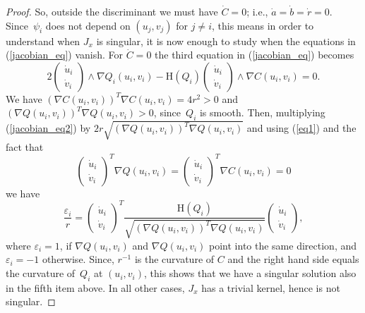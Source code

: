 \documentclass[12pt]{amsart}
\theoremstyle{definition}
\theoremstyle{definition}
\numberwithin{equation}{section}
\begin{document}
\begin{proof}
So, outside the discriminant we must have $\dot C=0$; i.e., $\dot a=\dot b=\dot r=0$. Since~$\psi_i$ does not depend on $(u_j,v_j)$ for $j\neq i$, this means in order to understand when $J_x$ is singular, it is now enough to study when the equations in (\ref{jacobian_eq}) vanish. 
For $\dot C=0$ the third equation in (\ref{jacobian_eq}) becomes
\begin{equation}\label{jacobian_eq2}
2\begin{pmatrix}\dot u_i\\ \dot v_i \end{pmatrix} \wedge \nabla Q_i(u_i,v_i) -  \mathrm H(Q_i)\begin{pmatrix}\dot u_i \\ \dot v_i \end{pmatrix}\wedge  \nabla C (u_i,v_i)=0.
\end{equation}
We have $(\nabla C (u_i,v_i))^T \nabla C (u_i,v_i) = 4r^2>0$ and $(\nabla Q (u_i,v_i))^T \nabla Q (u_i,v_i)>0$, since~$Q_i$ is smooth. Then, multiplying (\ref{jacobian_eq2}) by $2r\sqrt{(\nabla Q (u_i,v_i))^T \nabla Q (u_i,v_i)}$ and using (\ref{eq1}) and the fact that
$$\begin{pmatrix}\dot u_i \\ \dot v_i \end{pmatrix}^T \nabla Q(u_i,v_i) = \begin{pmatrix}\dot u_i \\ \dot v_i \end{pmatrix}^T \nabla C(u_i,v_i)=0$$
we have
$$\frac{\varepsilon_i}{r} = 
\begin{pmatrix}\dot u_i \\ \dot v_i \end{pmatrix}^T
\frac{\mathrm H(Q_i)}{\sqrt{(\nabla Q (u_i,v_i))^T \nabla Q (u_i,v_i)}}
\begin{pmatrix}\dot u_i \\ \dot v_i \end{pmatrix},$$
where $\varepsilon_i = 1$, if $\nabla Q(u_i,v_i)$ and $\nabla Q(u_i,v_i)$ point into the same direction, and $\varepsilon_i = -1$ otherwise. Since, $r^{-1}$ is the curvature of $C$ and the right hand side equals the curvature of~$Q_i$ at $(u_i,v_i)$, this shows that we have a singular solution also in the fifth item above. In all other cases, $J_x$ has a trivial kernel, hence is not singular. 
\end{proof}
\end{document}
